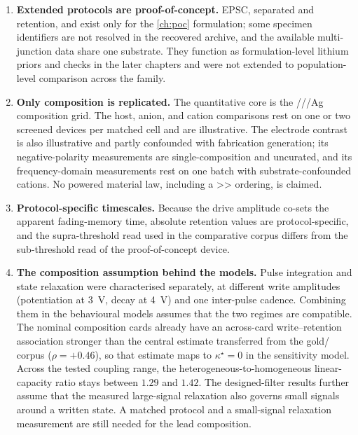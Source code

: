 \documentclass[12pt, twoside]{report}
\begin{document}
\begin{enumerate}
  \item \textbf{Extended protocols are proof-of-concept.} EPSC, separated \STM{} and \LTM{} retention, and \STDP{} exist only for the \cref{ch:poc} \Hybrane{} formulation; some specimen identifiers are not resolved in the recovered archive, and the available multi-junction data share one substrate. They function as formulation-level lithium priors and checks in the later chapters and were not extended to population-level comparison across the \PEO{} family.

  \item \textbf{Only composition is replicated.} The quantitative core is the \SY{}/\PEO{}/\LiTf{}/Ag composition grid. The host, anion, and cation comparisons rest on one or two screened devices per matched cell and are illustrative. The electrode contrast is also illustrative and partly confounded with fabrication generation; its negative-polarity measurements are single-composition and uncurated, and its frequency-domain measurements rest on one batch with substrate-confounded cations. No powered material law, including a >> ordering, is claimed.

  \item \textbf{Protocol-specific timescales.} Because the drive amplitude co-sets the apparent fading-memory time, absolute retention values are protocol-specific, and the supra-threshold read used in the comparative corpus differs from the sub-threshold read of the proof-of-concept device.

  \item \textbf{The composition assumption behind the models.} Pulse integration and state relaxation were characterised separately, at different write amplitudes (potentiation at \SI{3}{\volt}, decay at \SI{4}{\volt}) and one inter-pulse cadence. Combining them in the behavioural models assumes that the two regimes are compatible. The nominal composition cards already have an across-card write--retention association stronger than the central estimate transferred from the gold/\TMPE{} corpus ($\rho=+0.46$), so that estimate maps to $\kappa^{\star}=0$ in the sensitivity model. Across the tested coupling range, the heterogeneous-to-homogeneous linear-capacity ratio stays between $1.29$ and $1.42$. The designed-filter results further assume that the measured large-signal relaxation also governs small signals around a written state. A matched protocol and a small-signal relaxation measurement are still needed for the lead composition.


\end{enumerate}
\end{document}

